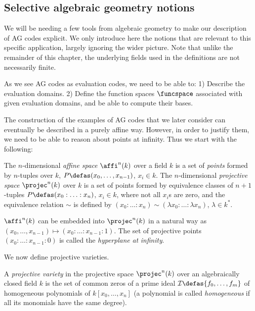 \subsection{Selective algebraic geometry notions}

We will be needing a few tools from algebraic geometry to make our description of AG codes explicit. We only introduce
here the notions that are relevant to this specific application,
largely ignoring the wider picture. Note that unlike the remainder of this chapter, the underlying fields used in the definitions
are not necessarily finite.

As we see AG codes as evaluation codes, we need to be able to: 1) Describe the evaluation domains.
2) Define the function spaces $\funcspace$ associated with given evaluation domains,
and be able to compute their bases.

\medskip

The construction of the examples of AG codes that we later consider can eventually be described in a purely affine way. However, in order to
justify them, we need to be able to reason about points at infinity. Thus we start with the following:

\begin{defi}
\label{def:affiprojec}
The $n$-dimensional \emph{affine space} $\affi^n(k)$ over a field $k$ is a set of \emph{points} formed by $n$-tuples over $k$,
$P \defas (x_0, \ldots, x_{n-1})$, $x_i \in k$.
The $n$-dimensional \emph{projective space} $\projec^n(k)$ over $k$ is a set of points formed by equivalence classes of $n+1$-tuples
$P \defas (x_0 : \ldots : x_n)$, $x_i \in k$, where not all $x_i$s are zero, and the equivalence relation $\sim$ is
defined by $(x_0 : \ldots : x_n) \sim (\lambda x_0 : \ldots : \lambda x_n)$, $\lambda \in k^*$.

\noindent
$\affi^n(k)$ can be embedded into $\projec^n(k)$ in a natural way as $(x_0, \ldots, x_{n-1}) \mapsto (x_0 : \ldots : x_{n-1} : 1)$.
The set of projective points $(x_0 : \ldots : x_{n-1} : 0)$ is called the \emph{hyperplane at infinity}.
\end{defi}

We now define projective varieties.

\begin{defi}
A \emph{projective variety} in the projective space $\projec^n(k)$ over an algebraically closed field $k$ is the set of common zeros
of a prime ideal $\mathcal{I} \defas \{f_0, \ldots, f_m\}$ of homogeneous polynomials of $k[x_0,\ldots,x_n]$ (a polynomial is called \emph{homogeneous}
if all its monomials have the same degree).
\end{defi}

